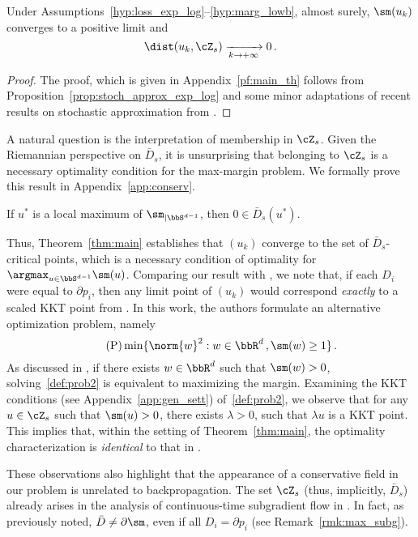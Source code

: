 \begin{theorem}\label{thm:main}
  Under Assumptions~\ref{hyp:loss_exp_log}--\ref{hyp:marg_lowb}, almost surely, $\sm(u_k)$ converges to a positive limit and 
  \begin{equation}\label{eq:conv_uk}
    \dist(u_k, \cZ_s) \xrightarrow[k \rightarrow + \infty]{} 0 \, .
  \end{equation}
\end{theorem}
\begin{proof}
  The proof, which is given in Appendix~\ref{pf:main_th} follows from Proposition~\ref{prop:stoch_approx_exp_log} and some minor adaptations of recent results on stochastic approximation from \cite{benaim2006dynamics,dav-dru-kak-lee-19}.
\end{proof}
A natural question is the interpretation of membership in $\cZ_s$. Given the Riemannian perspective on $\bar{D}_s$, it is unsurprising that belonging to $\cZ_s$ is a necessary optimality condition for the max-margin problem. We formally prove this result in Appendix~\ref{app:conserv}.
\begin{lemma}\label{lm:loc_max}
  If $u^*$ is a local maximum of $\sm_{|\bbS^{d-1}}$, then $0 \in \bar{D}_s(u^*)$.
\end{lemma}
Thus, Theorem~\ref{thm:main} establishes  that $(u_k)$ converge to the set of $\bar{D}_s$-critical points, which is a necessary condition of optimality for $\argmax_{u \in \bbS^{d-1}} \sm(u)$.
Comparing our result with \cite[Theorem 4.4]{Lyu_Li_maxmargin}, we note that, if each $D_i$ were equal to $\partial p_i$, then any limit point of $(u_k)$ would correspond \emph{exactly} to a scaled KKT point from \cite{Lyu_Li_maxmargin}. In this work, the authors formulate an alternative optimization problem, namely
\begin{equation*}\label{def:prob2}\tag{P}
  \min \{ \norm{w}^2 : w \in\bbR^d\, ,\sm(w) \geq 1\}\, .
\end{equation*}
 As discussed in \cite{Lyu_Li_maxmargin}, if there exists $w \in \bbR^d$ such that $\sm(w) >0$, solving~\eqref{def:prob2} is equivalent to maximizing the margin. Examining the KKT conditions (see Appendix~\ref{app:gen_sett}) of~\eqref{def:prob2}, we observe that for any $u \in \cZ_s$ such that $\sm(u)>0$, there exists $\lambda >0$, such that $\lambda u$ is a KKT point. This implies that, within the setting of Theorem~\ref{thm:main}, the  optimality characterization is \emph{identical} to that in \cite{Lyu_Li_maxmargin}. 
 
 These observations also highlight that the appearance of a conservative field in our problem is unrelated to backpropagation. The set $\cZ_s$ (thus, implicitly, $\bar{D}_s$) already arises in the analysis of continuous-time subgradient flow in \cite{Lyu_Li_maxmargin}. In fact, as previously noted, $\bar{D} \neq \partial \sm$, even if all $D_i = \partial p_i$ (see Remark~\ref{rmk:max_subg}).


